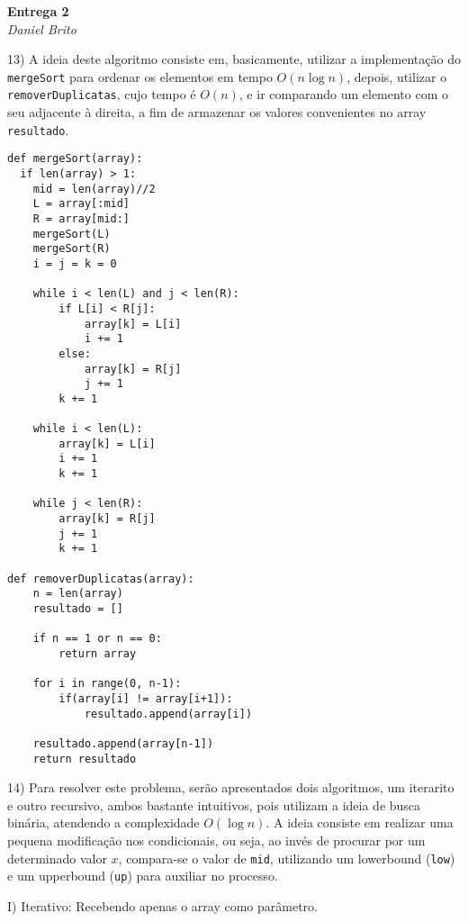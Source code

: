 \documentclass[]{article}
\begin{document}
\begin{center}
  \Large\textbf{Entrega 2}\\
  \large\textit{Daniel Brito}
\end{center}

13) A ideia deste algoritmo consiste em, basicamente, utilizar a implementação do \texttt{mergeSort} para ordenar os elementos em tempo $O(n \log n)$, depois, utilizar o \texttt{removerDuplicatas}, cujo tempo é $O(n)$, e ir comparando um elemento com o seu adjacente à direita, a fim de armazenar os valores convenientes no array \texttt{resultado}.

\begin{lstlisting}
def mergeSort(array):
  if len(array) > 1:
    mid = len(array)//2
    L = array[:mid]
    R = array[mid:]
    mergeSort(L)
    mergeSort(R)
    i = j = k = 0

    while i < len(L) and j < len(R):
        if L[i] < R[j]:
            array[k] = L[i]
            i += 1
        else:
            array[k] = R[j]
            j += 1
        k += 1

    while i < len(L):
        array[k] = L[i]
        i += 1
        k += 1

    while j < len(R):
        array[k] = R[j]
        j += 1
        k += 1
      
def removerDuplicatas(array):
    n = len(array)
    resultado = []
    
    if n == 1 or n == 0:
        return array
    
    for i in range(0, n-1):
        if(array[i] != array[i+1]):
            resultado.append(array[i])

    resultado.append(array[n-1])
    return resultado
\end{lstlisting}

\newpage

14) Para resolver este problema, serão apresentados dois algoritmos, um iterarito e outro recursivo, ambos bastante intuitivos, pois utilizam a ideia de busca binária, atendendo a complexidade $O(\log n)$. A ideia consiste em realizar uma pequena modificação nos condicionais, ou seja, ao invés de procurar por um determinado valor $x$, compara-se o valor de \texttt{mid}, utilizando um lowerbound (\texttt{low}) e um upperbound (\texttt{up}) para auxiliar no processo.

\vspace{0.5cm}

I) Iterativo: Recebendo apenas o array como parâmetro.
\end{document}
